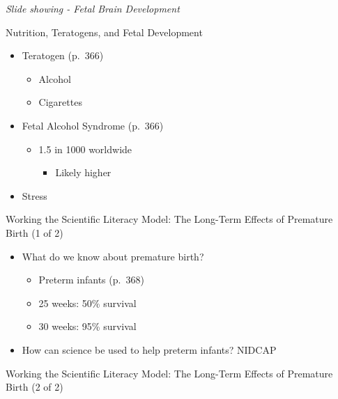 \documentclass[
]{book}
\providecommand{\tightlist}{%
  \setlength{\itemsep}{0pt}\setlength{\parskip}{0pt}}
\begin{document}
\emph{Slide showing - Fetal Brain Development}

Nutrition, Teratogens, and Fetal Development

\begin{itemize}
\tightlist
\item
  Teratogen (p.~366)

  \begin{itemize}
  \tightlist
  \item
    Alcohol
  \item
    Cigarettes
  \end{itemize}
\item
  Fetal Alcohol Syndrome (p.~366)

  \begin{itemize}
  \tightlist
  \item
    1.5 in 1000 worldwide

    \begin{itemize}
    \tightlist
    \item
      Likely higher
    \end{itemize}
  \end{itemize}
\item
  Stress
\end{itemize}

Working the Scientific Literacy Model: The Long-Term Effects of Premature Birth (1 of 2)

\begin{itemize}
\tightlist
\item
  What do we know about premature birth?

  \begin{itemize}
  \tightlist
  \item
    Preterm infants (p.~368)
  \item
    25 weeks: 50\% survival
  \item
    30 weeks: 95\% survival
  \end{itemize}
\item
  How can science be used to help preterm infants?
  NIDCAP
\end{itemize}

Working the Scientific Literacy Model: The Long-Term Effects of Premature Birth (2 of 2)
\end{document}
